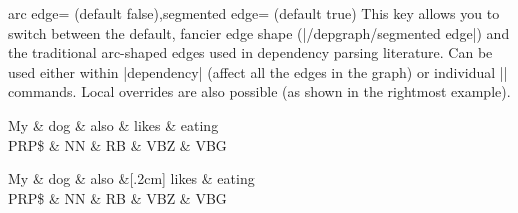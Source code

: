 \documentclass[a4paper]{ltxdoc}
\begin{document}
\begin{keylist}[/depgraph]{arc edge= (default false),segmented edge= (default true)}
   This key allows you to switch between the default, fancier edge shape (|/depgraph/segmented edge|) and the traditional arc-shaped edges used in dependency parsing literature. Can be used either within |dependency| (affect all the edges in the graph) or individual |\depedge| commands. Local overrides are also possible (as shown in the rightmost example).
\begin{codeexample}[]
\begin{dependency}
   \begin{deptext}[column sep=.7cm]
      My \& dog \& also \& likes \& eating \\
      PRP\$ \& NN \& RB \& VBZ \& VBG \\
   \end{deptext}
\end{dependency}
\quad
\begin{dependency}
   \begin{deptext}[column sep=.7cm]
      My \& dog \& also \&[.2cm] likes \& eating \\
      PRP\$ \& NN \& RB \& VBZ \& VBG \\
   \end{deptext}
\end{dependency}
\end{codeexample}
\end{keylist}
\end{document}
